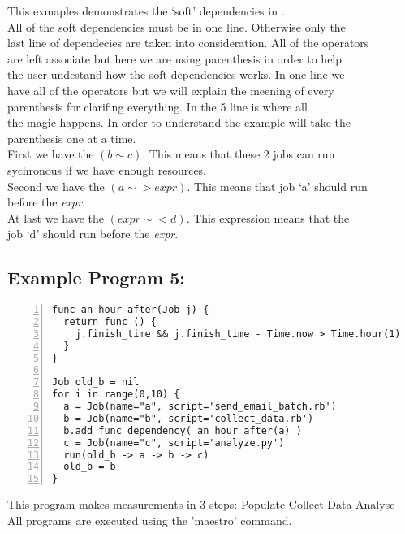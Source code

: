This exmaples demonstrates the `soft' dependencies in \lang{}.\\
\underline{All of the soft dependencies must be in one line.} Otherwise only the\\
last line of dependecies are taken into consideration. All of the operators\\
are left associate but here we are using parenthesis in order to help\\
the user undestand how the soft dependencies works. In one line we \\
have all of the operators but we will explain the meening of every \\
parenthesis for clarifing everything. In the 5 line is where all \\
the magic happens. In order to understand the example will take the\\
parenthesis one at a time.\\
First we have the $(b\sim c)$. This means that these 2 jobs can run\\
sychronous if we have enough resources. \\
Second we have the $(a\sim>expr)$. This means that job `a' should run\\
before the \textit{expr}. \\
At last we have the $(expr\sim<d)$. This expression means that the \\
job `d' should run before the \textit{expr}.

\subsection*{Example Program 5:}
\begin{Verbatim}[numbers=left]
func an_hour_after(Job j) {
  return func () {
    j.finish_time && j.finish_time - Time.now > Time.hour(1)
  }
}

Job old_b = nil
for i in range(0,10) {
  a = Job(name="a", script='send_email_batch.rb')
  b = Job(name="b", script='collect_data.rb')
  b.add_func_dependency( an_hour_after(a) )
  c = Job(name="c", script='analyze.py')
  run(old_b -> a -> b -> c)
  old_b = b
}
\end{Verbatim}
This program makes measurements in 3 steps:
Populate
Collect Data
Analyse
\\

All programs are executed using the 'maestro' command.
\\
